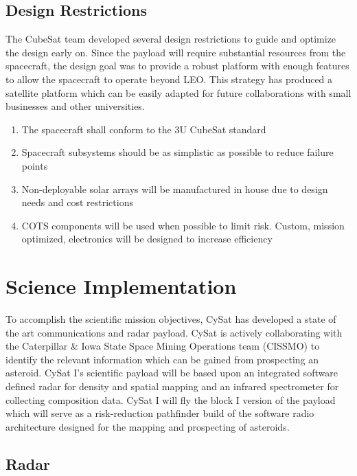 \documentclass[nocover]            %
{CSLI}                       %
\begin{document}
\subsection{Design Restrictions}
The CubeSat team developed several design restrictions to guide and optimize the design early on. Since the payload will require substantial resources from the spacecraft, the design goal was to provide a robust platform with enough features to allow the spacecraft to operate beyond LEO. This strategy has produced a satellite platform which can be easily adapted for future collaborations with small businesses and other universities.
\begin{enumerate}
\item The spacecraft shall conform to the 3U CubeSat standard
\item Spacecraft subsystems should be as simplistic as possible to reduce failure points
\item Non-deployable solar arrays will be manufactured in house due to design needs and cost restrictions
\item COTS components will be used when possible to limit risk. Custom, mission optimized, electronics will be designed to increase efficiency
\end{enumerate}

\section{Science Implementation}
To accomplish the scientific mission objectives, CySat has developed a state of the art communications and radar payload. CySat is actively collaborating with the Caterpillar \& Iowa State Space Mining Operations team (CISSMO) to identify the relevant information which can be gained from prospecting an asteroid. CySat I's scientific payload will be based upon an integrated software defined radar for density and spatial mapping and an infrared spectrometer for collecting composition data. CySat I will fly the block I version of the payload which will serve as a risk-reduction pathfinder build of the software radio architecture designed for the mapping and prospecting of asteroids.
\subsection{Radar}
\end{document}
